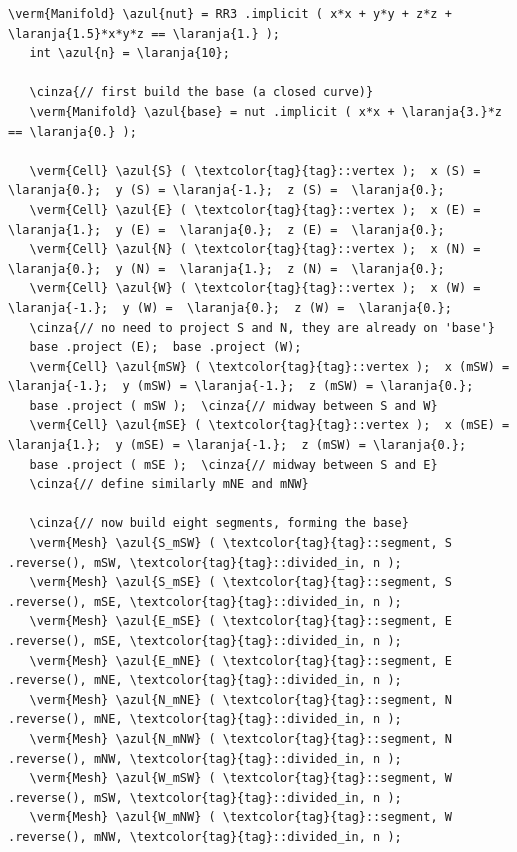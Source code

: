 \begin{Verbatim}[commandchars=\\\{\},formatcom=\small\tt,frame=single,
   label=parag-\ref{\numb section 2.\numb parag 13}.cpp,rulecolor=\color{coment},
   baselinestretch=0.94,framesep=2mm]
   \verm{Manifold} \azul{nut} = RR3 .implicit ( x*x + y*y + z*z + \laranja{1.5}*x*y*z == \laranja{1.} );
   int \azul{n} = \laranja{10};

   \cinza{// first build the base (a closed curve)}
   \verm{Manifold} \azul{base} = nut .implicit ( x*x + \laranja{3.}*z == \laranja{0.} );

   \verm{Cell} \azul{S} ( \textcolor{tag}{tag}::vertex );  x (S) =  \laranja{0.};  y (S) = \laranja{-1.};  z (S) =  \laranja{0.};
   \verm{Cell} \azul{E} ( \textcolor{tag}{tag}::vertex );  x (E) =  \laranja{1.};  y (E) =  \laranja{0.};  z (E) =  \laranja{0.};
   \verm{Cell} \azul{N} ( \textcolor{tag}{tag}::vertex );  x (N) =  \laranja{0.};  y (N) =  \laranja{1.};  z (N) =  \laranja{0.};
   \verm{Cell} \azul{W} ( \textcolor{tag}{tag}::vertex );  x (W) = \laranja{-1.};  y (W) =  \laranja{0.};  z (W) =  \laranja{0.};
   \cinza{// no need to project S and N, they are already on 'base'}
   base .project (E);  base .project (W);
   \verm{Cell} \azul{mSW} ( \textcolor{tag}{tag}::vertex );  x (mSW) = \laranja{-1.};  y (mSW) = \laranja{-1.};  z (mSW) = \laranja{0.};
   base .project ( mSW );  \cinza{// midway between S and W}
   \verm{Cell} \azul{mSE} ( \textcolor{tag}{tag}::vertex );  x (mSE) =  \laranja{1.};  y (mSE) = \laranja{-1.};  z (mSW) = \laranja{0.};
   base .project ( mSE );  \cinza{// midway between S and E}
   \cinza{// define similarly mNE and mNW}

   \cinza{// now build eight segments, forming the base}
   \verm{Mesh} \azul{S_mSW} ( \textcolor{tag}{tag}::segment, S .reverse(), mSW, \textcolor{tag}{tag}::divided_in, n );
   \verm{Mesh} \azul{S_mSE} ( \textcolor{tag}{tag}::segment, S .reverse(), mSE, \textcolor{tag}{tag}::divided_in, n );
   \verm{Mesh} \azul{E_mSE} ( \textcolor{tag}{tag}::segment, E .reverse(), mSE, \textcolor{tag}{tag}::divided_in, n );
   \verm{Mesh} \azul{E_mNE} ( \textcolor{tag}{tag}::segment, E .reverse(), mNE, \textcolor{tag}{tag}::divided_in, n );
   \verm{Mesh} \azul{N_mNE} ( \textcolor{tag}{tag}::segment, N .reverse(), mNE, \textcolor{tag}{tag}::divided_in, n );
   \verm{Mesh} \azul{N_mNW} ( \textcolor{tag}{tag}::segment, N .reverse(), mNW, \textcolor{tag}{tag}::divided_in, n );
   \verm{Mesh} \azul{W_mSW} ( \textcolor{tag}{tag}::segment, W .reverse(), mSW, \textcolor{tag}{tag}::divided_in, n );
   \verm{Mesh} \azul{W_mNW} ( \textcolor{tag}{tag}::segment, W .reverse(), mNW, \textcolor{tag}{tag}::divided_in, n );


\end{Verbatim}
